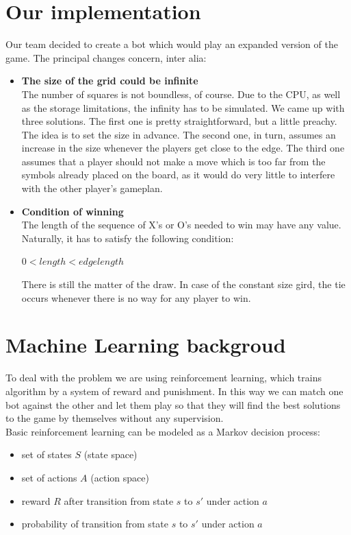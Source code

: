 \documentclass[a4paper,12pt]{book}
\begin{document}
	\section{Our implementation}
	Our team decided to create a bot which would play an expanded version of the game. The principal changes concern, inter alia:\\
	\begin{itemize}
		\item \textbf{The size of the grid could be infinite}\\
		The number of squares is not boundless, of course. Due to the CPU, as well as the storage limitations, the infinity has to be simulated. We came up with three solutions. The first one is pretty straightforward, but a little preachy. The idea is to set the size in advance. The second one, in turn, assumes an increase in the size whenever the players get close to the edge. The third one assumes that a player should not make a move which is too far from the symbols already placed on the board, as it would do very little to interfere with the other player's gameplan.
		\item \textbf{Condition of winning}\\
		The length of the sequence of X's or O's needed to win may have any value. Naturally, it has to satisfy the following condition:
		\begin{center}
			$0 < length < edgelength$
		\end{center}
		There is still the matter of the draw. In case of the constant size gird, the tie occurs whenever there is no way for any player to win.
	\end{itemize}
	\section{Machine Learning backgroud}
To deal with the problem we are using reinforcement learning, which trains algorithm by a system of reward and punishment. In this way we can match one bot against the other and let them play so that they will find the best solutions to the game by themselves without any supervision. 
\\Basic reinforcement learning can be modeled as a Markov decision process:
	\begin{itemize}
		\item set of states $S$ (state space)
		\item set of actions $A$ (action space)
		\item reward $R$ after transition from state $s$ to $s'$ under action $a$
		\item probability of transition from state $s$ to $s'$ under action $a$
	\end{itemize}
\pagebreak
\end{document}
